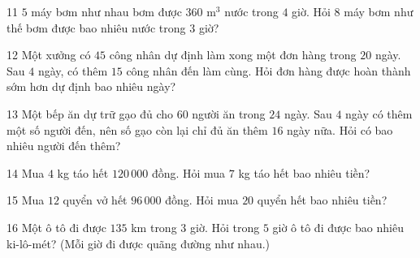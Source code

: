 \gap
\begin{probbox}{11}{\relax}
$5$ máy bơm như nhau bơm được $360$ m$^3$ nước trong $4$ giờ. Hỏi $8$ máy bơm như thế bơm được bao nhiêu nước trong $3$ giờ?
\end{probbox}
\gap
\begin{probbox}{12}{\relax}
Một xưởng có $45$ công nhân dự định làm xong một đơn hàng trong $20$ ngày. Sau $4$ ngày, có thêm $15$ công nhân đến làm cùng. Hỏi đơn hàng được hoàn thành sớm hơn dự định bao nhiêu ngày?
\end{probbox}
\gap
\begin{probbox}{13}{\relax}
Một bếp ăn dự trữ gạo đủ cho $60$ người ăn trong $24$ ngày. Sau $4$ ngày có thêm một số người đến, nên số gạo còn lại chỉ đủ ăn thêm $16$ ngày nữa. Hỏi có bao nhiêu người đến thêm?
\end{probbox}
\gap
\begin{probbox}{14}{\relax}
Mua $4$ kg táo hết $120\,000$ đồng. Hỏi mua $7$ kg táo hết bao nhiêu tiền?
\end{probbox}
\gap
\begin{probbox}{15}{\relax}
Mua $12$ quyển vở hết $96\,000$ đồng. Hỏi mua $20$ quyển hết bao nhiêu tiền?
\end{probbox}
\gap
\begin{probbox}{16}{\relax}
Một ô tô đi được $135$ km trong $3$ giờ. Hỏi trong $5$ giờ ô tô đi được bao nhiêu ki-lô-mét? (Mỗi giờ đi được quãng đường như nhau.)
\end{probbox}
